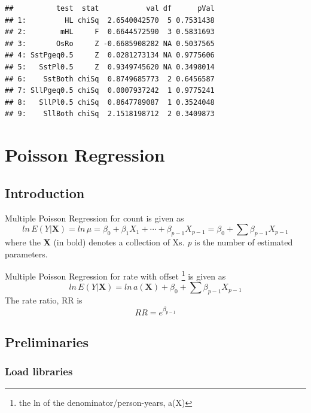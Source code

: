 \documentclass[
]{book}
\makeatletter
\newenvironment{Shaded}{\begin{snugshade}}{\end{snugshade}}
\newcommand{\NormalTok}[1]{#1}
\newcommand{\SpecialCharTok}[1]{\textcolor[rgb]{0,0,0}{#1}}
\newenvironment{kframe}{%
\medskip{}
\setlength{\fboxsep}{.8em}
 \def\at@end@of@kframe{}%
 \ifinner\ifhmode%
  \def\at@end@of@kframe{\end{minipage}}%
  \begin{minipage}{\columnwidth}%
 \fi\fi%
 \def\FrameCommand##1{\hskip\@totalleftmargin \hskip-\fboxsep
 \colorbox{shadecolor}{##1}\hskip-\fboxsep
     \hskip-\linewidth \hskip-\@totalleftmargin \hskip\columnwidth}%
 \MakeFramed {\advance\hsize-\width
   \@totalleftmargin\z@ \linewidth\hsize
   \@setminipage}}%
 {\par\unskip\endMakeFramed%
 \at@end@of@kframe}
\renewenvironment{Shaded}{\begin{kframe}}{\end{kframe}}
\makeatother
\begin{document}
\begin{Shaded}
\end{Shaded}

\begin{verbatim}
##          test  stat           val df      pVal
## 1:         HL chiSq  2.6540042570  5 0.7531438
## 2:        mHL     F  0.6644572590  3 0.5831693
## 3:       OsRo     Z -0.6685908282 NA 0.5037565
## 4: SstPgeq0.5     Z  0.0281273134 NA 0.9775606
## 5:   SstPl0.5     Z  0.9349745620 NA 0.3498014
## 6:    SstBoth chiSq  0.8749685773  2 0.6456587
## 7: SllPgeq0.5 chiSq  0.0007937242  1 0.9775241
## 8:   SllPl0.5 chiSq  0.8647789087  1 0.3524048
## 9:    SllBoth chiSq  2.1518198712  2 0.3409873
\end{verbatim}

\hypertarget{poisson-regression}{%
\chapter{Poisson Regression}\label{poisson-regression}}

\hypertarget{introduction-1}{%
\section{Introduction}\label{introduction-1}}

Multiple Poisson Regression for count is given as
\[ln\,E(Y|\mathbf{X})=ln\,\mu=\beta_{0}+\beta_{1}X_{1}+\cdots+\beta_{p-1}X_{p-1}=\beta_{0}+\sum\beta_{p-1}X_{p-1}\]
where the \textbf{X} (in bold) denotes a collection of Xs. \emph{p} is the number of estimated parameters.

Multiple Poisson Regression for rate with offset \footnote{the ln of the denominator/person-years, a(X)} is given as
\[ln\,E(Y|\mathbf{X})=ln\,a(\mathbf{X})+\beta_{0}+\sum\beta_{p-1}X_{p-1}\]
The rate ratio, RR is
\[RR=e^{\beta_{p-1}}\]

\hypertarget{preliminaries}{%
\section{Preliminaries}\label{preliminaries}}

\hypertarget{load-libraries}{%
\subsection{Load libraries}\label{load-libraries}}
\end{document}
